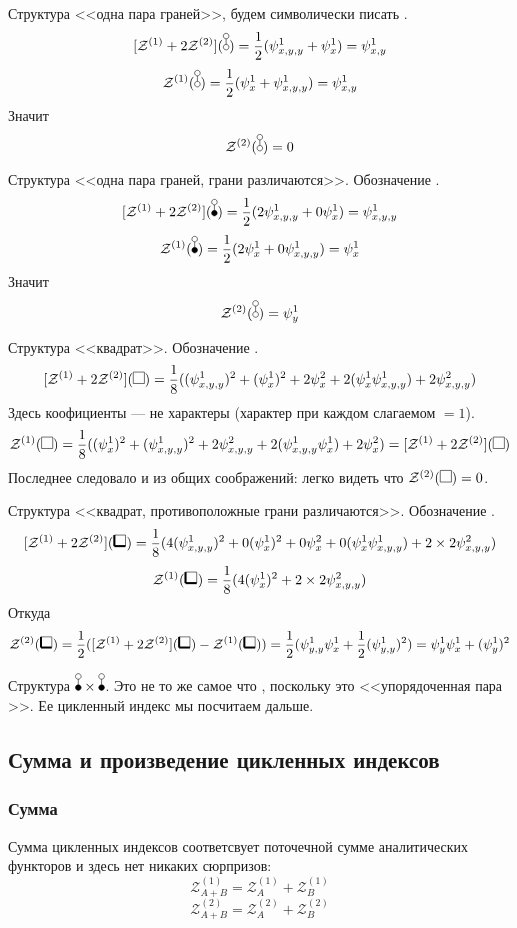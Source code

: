 Структура <<одна пара граней>>, будем символически писать \dA.
$$
\Zfull(\dA) = \frac{1}{2}(\psi_{x,y,y}^1 + \psi_{x}^1) = \psi_{x,y}^1
$$
$$
\mathcal Z^{(1)}(\dA) = \frac{1}{2}(\psi_{x}^1 + \psi_{x, y, y}^1) = \psi_{x,y}^1
$$
Значит
$$
\mathcal Z^{(2)}(\dA) = 0
$$

Структура <<одна пара граней, грани различаются>>. Обозначение \dB.
$$
\Zfull(\dB) = \frac{1}{2}(2\psi_{x,y,y}^1 + 0\psi_{x}^1) = \psi_{x,y,y}^1
$$
$$
\mathcal Z^{(1)}(\dB) = \frac{1}{2}(2\psi_{x}^1 + 0\psi_{x, y, y}^1) = \psi_{x}^1
$$
Значит
$$
\mathcal Z^{(2)}(\dA) = \psi_{y}^1
$$

Структура <<квадрат>>. Обозначение \dAA.
$$
\Zfull(\dAA) = \frac{1}{8}((\psi_{x,y,y}^1)^2 + (\psi_{x}^1)^2 + 2\psi_{x}^2 +
2(\psi_x^1\psi_{x,y,y}^1) + 2\psi_{x,y,y}^2)
$$
Здесь коофициенты --- не характеры (характер при каждом слагаемом $= 1$).
$$
\mathcal Z^{(1)}(\dAA) = \frac{1}{8}((\psi_{x}^1)^2 + (\psi_{x, y, y}^1)^2 +
2\psi_{x, y, y}^2 + 2(\psi_{x, y, y}^1\psi_{x}^1) + 2\psi_{x}^2) = \Zfull(\dAA)
$$
Последнее следовало и из общих соображений: легко видеть что $\mathcal
Z^{(2)}(\dAA) = 0$.

Структура <<квадрат, противоположные грани различаются>>. Обозначение \dBB.
$$
\Zfull(\dBB) = \frac{1}{8}(4(\psi_{x,y,y}^1)^2 + 0(\psi_{x}^1)^2 + 0\psi_{x}^2
+ 0(\psi_x^1\psi_{x,y,y}^1) + 2\times2\psi_{x,y,y}^2)
$$
$$
\mathcal Z^{(1)}(\dBB) = \frac{1}{8}(4(\psi_{x}^1)^2 + 2\times2\psi_{x,y,y}^2)
$$
Откуда
$$
\mathcal Z^{(2)}(\dBB) = \frac{1}{2}(\Zfull(\dBB) - \mathcal
Z^{(1)}(\dBB)) = \frac{1}{2}(\psi_{y,y}^1\psi_{x}^1 +
\frac{1}{2}(\psi_{y, y}^1)^2) = \psi_{y}^1\psi_{x}^1 + (\psi_{y}^1)^2 $$

Структура $\dB \times \dB$. Это не то же самое что \dBB, поскольку это <<упорядоченная пара \dB>>.
Ее цикленный индекс мы посчитаем дальше.

\subsection{Сумма и произведение цикленных индексов}
\subsubsection{Сумма}
Сумма цикленных индексов соответсвует поточечной сумме аналитических
функторов и здесь нет никаких сюрпризов:
$$
\mathcal Z_{A + B}^{(1)} = \mathcal Z_A^{(1)} + \mathcal Z_B^{(1)}
$$
$$
\mathcal Z_{A + B}^{(2)} = \mathcal Z_A^{(2)} + \mathcal Z_B^{(2)}
$$
